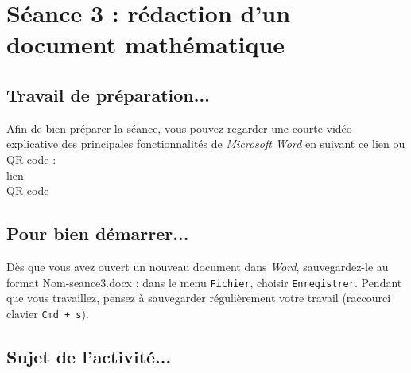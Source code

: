 


%
%
%
%




\pagebreak

\section{Séance 3 : rédaction d'un document mathématique}\label{ficheTexte4e1}

\subsection{Travail de préparation...}

Afin de bien préparer la séance, vous pouvez regarder une courte vidéo explicative des principales fonctionnalités de \emph{Microsoft Word} en suivant ce lien ou QR-code :\\

lien\\
QR-code

\subsection{Pour bien démarrer...}

Dès que vous avez ouvert un nouveau document dans \emph{Word}, sauvegardez-le au format Nom-seance3.docx : dans le menu \texttt{Fichier}, choisir \texttt{Enregistrer}. Pendant que vous travaillez, pensez à sauvegarder régulièrement votre travail (raccourci clavier \texttt{Cmd + s}).   


\subsection{Sujet de l'activité...}

\vspace{10pt}


